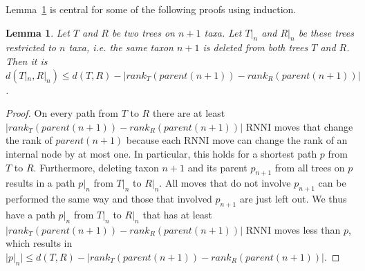 \documentclass[11pt, a4paper]{article}
\newcommand{\nni}{\mathrm{NNI}}
\newcommand{\rnni}{\mathrm{RNNI}}
\newtheorem{lemma}[definition]{Lemma}
\begin{document}
Lemma~\ref{lemma:distance_delete_taxon} is central for some of the following proofs using induction.

\begin{lemma}
    Let $T$ and $R$ be two trees on $n+1$ taxa.
    Let $T|_n$ and $R|_n$ be these trees restricted to $n$ taxa, i.e. the same taxon $n+1$ is deleted from both trees $T$ and $R$.
    Then it is $d(T|_n, R|_n) \leq d(T,R) - |rank_T(parent(n+1)) - rank_R(parent(n+1))|$.
    \label{lemma:distance_delete_taxon}
\end{lemma}

\begin{proof}
    On every path from $T$ to $R$ there are at least $|rank_T(parent(n+1)) - rank_R(parent(n+1))|$ $\rnni$ moves that change the rank of $parent(n+1)$ because each $\rnni$ move can change the rank of an internal node by at most one.
    In particular, this holds for a shortest path $p$ from $T$ to $R$.
    Furthermore, deleting taxon $n+1$ and its parent $p_{n+1}$ from all trees on $p$ results in a path $p|_n$ from $T|_n$ to $R|_n$.
    All moves that do not involve $p_{n+1}$ can be performed the same way and those that involved $p_{n+1}$ are just left out.
    We thus have a path $p|_n$ from $T|_n$ to $R|_n$ that has at least $|rank_T(parent(n+1)) - rank_R(parent(n+1))|$ $\rnni$ moves less than $p$, which results in $|p|_n| \leq d(T,R) - |rank_T(parent(n+1)) - rank_R(parent(n+1))|$.

\end{proof}
\end{document}
